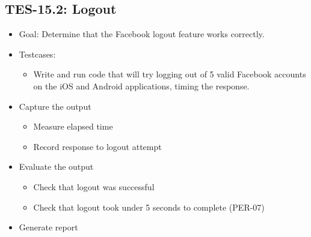 \subsection{TES-15.2: Logout}
\begin{itemize}
\item Goal: Determine that the Facebook logout feature works correctly.
\item Testcases: 
\begin{itemize}
\item Write and run code that will try logging out of 5 valid Facebook accounts 
on the iOS and Android applications, timing the response.
\end{itemize}
\item Capture the output 
\begin{itemize}
\item Measure elapsed time 
\item Record response to logout attempt
\end{itemize}
\item Evaluate the output 
\begin{itemize}
\item Check that logout was successful
\item Check that logout took under 5 seconds to complete (PER-07) 
\end{itemize}
\item Generate report 
\end{itemize}


